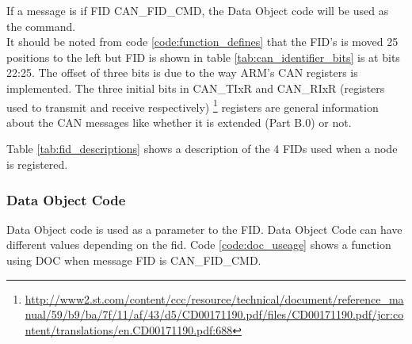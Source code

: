 If a message is if FID CAN\_FID\_CMD, the Data Object code will be used as the command.\\
It should be noted from code \ref{code:function_defines} that the FID's is moved 25 positions to the left but FID is shown in table \ref{tab:can_identifier_bits} is at bits 22:25. 
The offset of three bits is due to the way ARM's CAN registers is implemented. The three initial bits in CAN\_TIxR and CAN\_RIxR (registers used to transmit and receive respectively) \footnote{\url{http://www2.st.com/content/ccc/resource/technical/document/reference_manual/59/b9/ba/7f/11/af/43/d5/CD00171190.pdf/files/CD00171190.pdf/jcr:content/translations/en.CD00171190.pdf:688}} registers are general information about the CAN messages like whether it is extended (Part B.0) or not.
\begin{table}[H]
\centering
\caption{Descriptions of the FIDs mentioned in code \ref{code:function_defines}}
\label{tab:fid_descriptions}
\end{table}

Table \ref{tab:fid_descriptions} shows a description of the 4 FIDs used when a node is registered. 

\subsubsection*{Data Object Code}
Data Object code is used as a parameter to the FID. Data Object Code can have different values depending on the fid. Code \ref{code:doc_useage} shows a function using DOC when message FID is CAN\_FID\_CMD.

